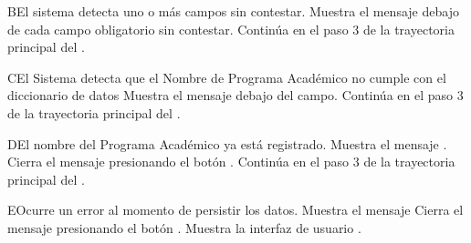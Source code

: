 
\begin{UCtrayectoriaA}{B}{El sistema detecta uno o más campos sin contestar.}
    \UCpaso Muestra el mensaje  debajo de cada campo obligatorio sin contestar.
    \UCpaso Continúa en el paso 3 de la trayectoria principal del .
\end{UCtrayectoriaA}


\begin{UCtrayectoriaA}{C}{El Sistema detecta que el Nombre de Programa Académico no cumple con el diccionario de datos}
    \UCpaso Muestra el mensaje  debajo del campo.
    \UCpaso Continúa en el paso 3 de la trayectoria principal del .
\end{UCtrayectoriaA}

\begin{UCtrayectoriaA}{D}{El nombre del Programa Académico ya está registrado.}
    \UCpaso Muestra el mensaje .
    \UCpaso[\UCactor] Cierra el mensaje presionando el botón .
    \UCpaso Continúa en el paso 3 de la trayectoria principal del .
\end{UCtrayectoriaA}

\begin{UCtrayectoriaA}{E}{Ocurre un error al momento de persistir los datos.}
    \UCpaso Muestra el mensaje 
    \UCpaso[\UCactor] Cierra el mensaje presionando el botón .
    \UCpaso Muestra la interfaz de usuario .
\end{UCtrayectoriaA}